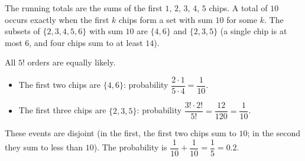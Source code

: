 The running totals are the sums of the first $1$, $2$, $3$, $4$, $5$ chips. A total of $10$ occurs exactly when the first $k$ chips form a set with sum $10$ for some $k$. The subsets of $\{2,3,4,5,6\}$ with sum $10$ are $\{4,6\}$ and $\{2,3,5\}$ (a single chip is at most $6$, and four chips sum to at least $14$).

All $5!$ orders are equally likely.
\begin{itemize}
\item The first two chips are $\{4,6\}$: probability $\dfrac{2\cdot1}{5\cdot4}=\dfrac{1}{10}$.
\item The first three chips are $\{2,3,5\}$: probability $\dfrac{3!\cdot2!}{5!}=\dfrac{12}{120}=\dfrac{1}{10}$.
\end{itemize}
These events are disjoint (in the first, the first two chips sum to $10$; in the second they sum to less than $10$). The probability is $\dfrac{1}{10}+\dfrac{1}{10}=\dfrac{1}{5}=\boxed{0.2}$.
